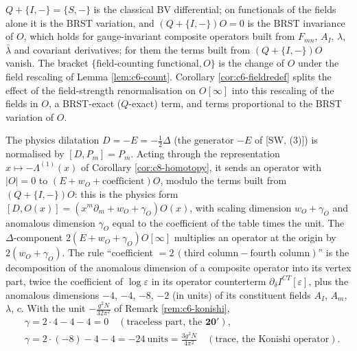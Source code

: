 \begin{remark}
$Q+\{I,-\}=\{S,-\}$ is the classical BV differential; on functionals of the fields alone it is the BRST variation, and $(Q+\{I,-\})O=0$ is the BRST invariance of $O$, which holds for gauge-invariant composite operators built from $F_{mn}$, $A_I$, $\lambda$, $\bar\lambda$ and covariant derivatives; for them the terms built from $(Q+\{I,-\})O$ vanish. The bracket $\{\text{field-counting functional},O\}$ is the change of $O$ under the field rescaling of Lemma \ref{lem:c6-count}. Corollary \ref{cor:c6-fieldredef} splits the effect of the field-strength renormalisation on $O[\infty]$ into this rescaling of the fields in $O$, a BRST-exact ($Q$-exact) term, and terms proportional to the BRST variation of $O$.
\end{remark}

\begin{remark}
The physics dilatation $D=-E=-\tfrac12\Delta$ (the generator $-E$ of [SW, (3)]) is normalised by $[D,P_m]=P_m$. Acting through the representation $x\mapsto-\Lambda^{(1)}(x)$ of Corollary \ref{cor:c8-homotopy}, it sends an operator with $|O|=0$ to $(E+w_O+\text{coefficient})O$, modulo the terms built from $(Q+\{I,-\})O$: this is the physics form $[D,O(x)]=(x^m\partial_m+w_O+\gamma_O)O(x)$, with scaling dimension $w_O+\gamma_O$ and anomalous dimension $\gamma_O$ equal to the coefficient of the table times the unit. The $\Delta$-component $2(E+w_O+\gamma_O)O[\infty]$ multiplies an operator at the origin by $2(w_O+\gamma_O)$. The rule ``coefficient $=2\,(\text{third column}-\text{fourth column})$'' is the decomposition of the anomalous dimension of a composite operator into its vertex part, twice the coefficient of $\log\varepsilon$ in its operator counterterm $\partial_\delta I^{CT}[\varepsilon]$, plus the anomalous dimensions $-4$, $-4$, $-8$, $-2$ (in units) of its constituent fields $A_I$, $A_m$, $\lambda$, $c$. With the unit $-\frac{g^2N}{32\pi^2}$ of Remark \ref{rem:c6-konishi},
\[
\begin{aligned}&\gamma=2\cdot4-4-4=0\quad(\text{traceless part, the }\mathbf{20'}),\\ &\gamma=2\cdot(-8)-4-4=-24\ \text{units}=\frac{3g^2N}{4\pi^2}\quad(\text{trace, the Konishi operator}).\end{aligned}
\]
\end{remark}

